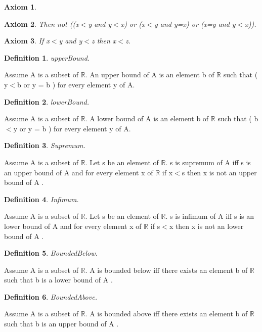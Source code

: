 \documentclass{article}
\newenvironment{forthel}{\begin{leftbar}}{\end{leftbar}}
\newtheorem{axiom}{Axiom}
\newtheorem{definition}{Definition}
\begin{document}
\begin{forthel}
\begin{axiom}
\end{axiom}

\begin{axiom} Then not ((x$<$y and y$<$x) or (x$<$y and y=x) or (x=y and y$<$x)).

\end{axiom}
\begin{axiom} If x$<$y and y$<$z then x$<$z.

\end{axiom}



\begin{definition} upperBound.

\end{definition}
Assume A is a subset of $\mathbb{R}$.
An upper bound of A is an element b of $\mathbb{R}$ such that ( y$<$b or y = b ) for every element y of A.

\begin{definition} lowerBound.

\end{definition}
Assume A is a subset of $\mathbb{R}$.
A lower bound of A is an element b of $\mathbb{R}$ such that ( b$<$y or y = b ) for every element y of A.

\begin{definition} Supremum.

\end{definition}
Assume A is a subset of $\mathbb{R}$.
Let s be an element of $\mathbb{R}$.
s is supremum of A  iff s is an upper bound of A 
and for every element x of $\mathbb{R}$ if x$<$s then x is not an upper bound of A .

\begin{definition} Infimum.

\end{definition}
Assume A is a subset of $\mathbb{R}$.
Let s be an element of $\mathbb{R}$.
s is infimum of A  iff s is an lower bound of A 
and for every element x of $\mathbb{R}$ if s$<$x then x is not an lower bound of A .

\begin{definition} BoundedBelow.

\end{definition}
Assume A is a subset of $\mathbb{R}$.
A is bounded below  iff 
there exists an element b of $\mathbb{R}$ such that b is a lower bound of A .

\begin{definition} BoundedAbove.

\end{definition}
Assume A is a subset of $\mathbb{R}$.
A is bounded above  iff 
there exists an element b of $\mathbb{R}$ such that b is an upper bound of A .


\end{forthel}
\end{document}
